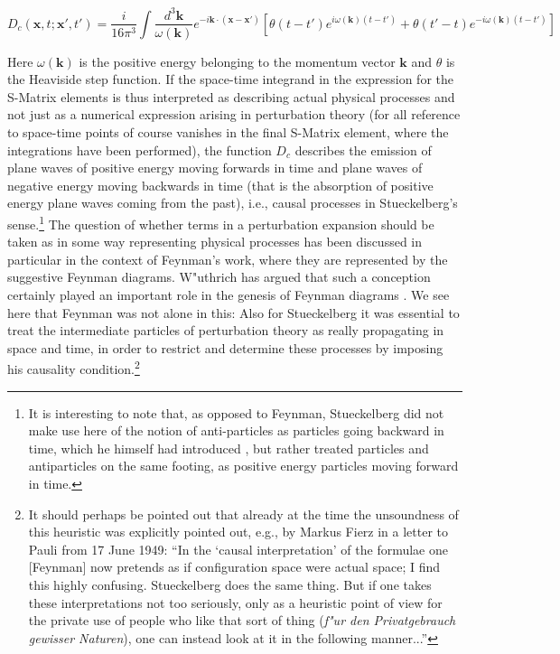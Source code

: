 \documentclass[12pt,a4paper]{article}
\begin{document}
\begin{equation}
\label{eq:causal}
D_c (\mathbf{x}, t; \mathbf{x}', t') = \frac{i}{16 \pi^3} \int \frac{d^3 \mathbf{k}}{\omega (\mathbf{k})} e^{-i \mathbf{k} \cdot (\mathbf{x} - \mathbf{x}')} \left[ \theta (t-t') e^{i \omega(\mathbf{k}) (t-t')} + \theta (t'-t) e^{-i \omega(\mathbf{k}) (t-t')} \right]
\end{equation}

Here $\omega (\mathbf{k})$ is the positive energy belonging to the momentum vector $\mathbf{k}$ and $\theta$ is the Heaviside step function. If the space-time integrand in the expression for the S-Matrix elements is thus interpreted as describing actual physical processes and not just as a numerical expression arising in perturbation theory (for all reference to space-time points of course vanishes in the final S-Matrix element, where the integrations have been performed), the function $D_c$ describes the emission of plane waves of positive energy moving forwards in time and plane waves of negative energy moving backwards in time (that is the absorption of positive energy plane waves coming from the past), i.e., causal processes in Stueckelberg's sense.\footnote{It is interesting to note that, as opposed to Feynman, Stueckelberg did not make use here of the notion of anti-particles as particles going backward in time, which he himself had introduced \citep{stueckelberg_1941_la-signification}, but rather treated particles and antiparticles on the same footing, as positive energy particles moving forward in time.} The question of whether terms in a perturbation expansion should be taken as in some way representing physical processes has been discussed in particular in the context of Feynman's work, where they are represented by the suggestive Feynman diagrams. W"uthrich has argued that such a conception certainly played an important role in the genesis of Feynman diagrams \citep{wuethrich_2010_the-genesis}. We see here that Feynman was not alone in this: Also for Stueckelberg it was essential to treat the intermediate particles of perturbation theory as really propagating in space and time, in order to restrict and determine these processes by imposing his causality condition.\footnote{\label{fn:fierz} It should perhaps be pointed out that already at the time the unsoundness of this heuristic was explicitly pointed out, e.g., by Markus Fierz in a letter to Pauli from 17 June 1949: ``In the `causal interpretation' of the formulae one [Feynman] now pretends as if configuration space were actual space; I find this highly confusing. Stueckelberg does the same thing. But if one takes these interpretations not too seriously, only as a heuristic point of view for the private use of people who like that sort of thing (\emph{f"ur den Privatgebrauch gewisser Naturen}), one can instead look at it in the following manner...''}
\end{document}
